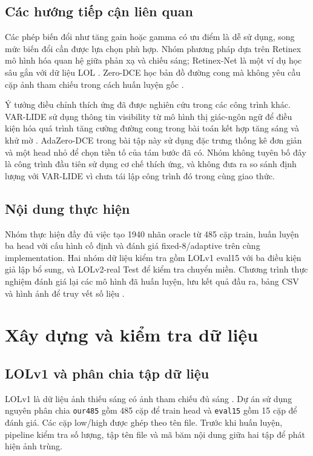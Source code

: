\subsection{Các hướng tiếp cận liên quan}
Các phép biến đổi như tăng gain hoặc gamma có ưu điểm là dễ sử dụng, song mức biến đổi cần được lựa chọn phù hợp. Nhóm phương pháp dựa trên Retinex mô hình hóa quan hệ giữa phản xạ và chiếu sáng; Retinex-Net là một ví dụ học sâu gắn với dữ liệu LOL \cite{lol}. Zero-DCE học bản đồ đường cong mà không yêu cầu cặp ảnh tham chiếu trong cách huấn luyện gốc \cite{zerodce}.

Ý tưởng điều chỉnh thích ứng đã được nghiên cứu trong các công trình khác. VAR-LIDE sử dụng thông tin visibility từ mô hình thị giác-ngôn ngữ để điều kiện hóa quá trình tăng cường đường cong trong bài toán kết hợp tăng sáng và khử mờ \cite{varlide}. AdaZero-DCE trong bài tập này sử dụng đặc trưng thống kê đơn giản và một head nhỏ để chọn tiền tố của tám bước đã có. Nhóm không tuyên bố đây là công trình đầu tiên sử dụng cơ chế thích ứng, và không đưa ra so sánh định lượng với VAR-LIDE vì chưa tái lập công trình đó trong cùng giao thức.

\subsection{Nội dung thực hiện}
Nhóm thực hiện đầy đủ việc tạo 1940 nhãn oracle từ 485 cặp train, huấn luyện ba head với cấu hình cố định và đánh giá fixed-8/adaptive trên cùng implementation. Hai nhóm dữ liệu kiểm tra gồm LOLv1 eval15 với ba điều kiện giả lập bổ sung, và LOLv2-real Test để kiểm tra chuyển miền. Chương trình thực nghiệm đánh giá lại các mô hình đã huấn luyện, lưu kết quả đầu ra, bảng CSV và hình ảnh để truy vết số liệu \cite{artifact}.

\section{Xây dựng và kiểm tra dữ liệu}
\subsection{LOLv1 và phân chia tập dữ liệu}
LOLv1 là dữ liệu ảnh thiếu sáng có ảnh tham chiếu đủ sáng \cite{lol}. Dự án sử dụng nguyên phân chia \texttt{our485} gồm 485 cặp để train head và \texttt{eval15} gồm 15 cặp để đánh giá. Các cặp low/high được ghép theo tên file. Trước khi huấn luyện, pipeline kiểm tra số lượng, tập tên file và mã băm nội dung giữa hai tập để phát hiện ảnh trùng.

